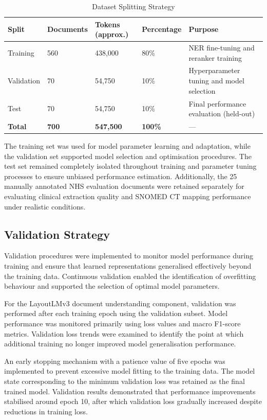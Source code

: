 \begin{table}[htbp]
\centering
\caption{Dataset Splitting Strategy}
\label{tab:dataset_split}
\begin{tabular}{|p{2.5cm}|p{2.5cm}|p{2.4cm}|p{2.5cm}|p{4cm}|}
\hline
\textbf{Split} & \textbf{Documents} & \textbf{Tokens (approx.)} & \textbf{Percentage} & \textbf{Purpose} \\
\hline
Training & 560 & 438,000 & 80\% & NER fine-tuning and reranker training \\
\hline
Validation & 70 & 54,750 & 10\% & Hyperparameter tuning and model selection \\
\hline
Test & 70 & 54,750 & 10\% & Final performance evaluation (held-out) \\
\hline
\textbf{Total} & \textbf{700} & \textbf{547,500} & \textbf{100\%} & --- \\
\hline
\end{tabular}
\end{table}

The training set was used for model parameter learning and adaptation, while the validation set supported model selection and optimisation procedures. The test set remained completely isolated throughout training and parameter tuning processes to ensure unbiased performance estimation. Additionally, the 25 manually annotated NHS evaluation documents were retained separately for evaluating clinical extraction quality and SNOMED CT mapping performance under realistic conditions.

\subsection{Validation Strategy}
Validation procedures were implemented to monitor model performance during training and ensure that learned representations generalised effectively beyond the training data. Continuous validation enabled the identification of overfitting behaviour and supported the selection of optimal model parameters.

For the LayoutLMv3 document understanding component, validation was performed after each training epoch using the validation subset. Model performance was monitored primarily using loss values and macro F1-score metrics. Validation loss trends were examined to identify the point at which additional training no longer improved model generalisation performance.

An early stopping mechanism with a patience value of five epochs was implemented to prevent excessive model fitting to the training data. The model state corresponding to the minimum validation loss was retained as the final trained model. Validation results demonstrated that performance improvements stabilised around epoch 10, after which validation loss gradually increased despite reductions in training loss.

